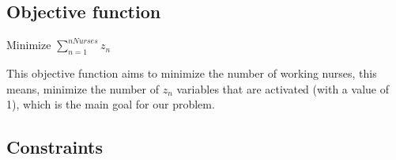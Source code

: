 \subsection{Objective function}
\begin{center}
Minimize $ \sum\limits_{n=1}^{nNurses} z_{n}  $ \\
\end{center}

This objective function aims to minimize the number of working nurses, this means, minimize the number of $z_n$ variables that are activated (with a value of 1), which is the main goal for our problem.

\subsection{Constraints}

